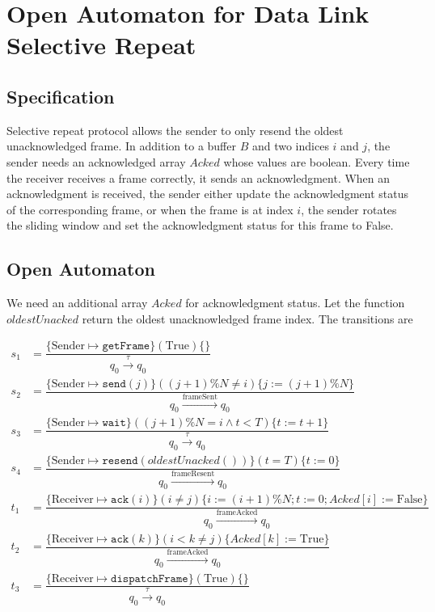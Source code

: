 \section{Open Automaton for Data Link Selective Repeat}
\subsection{Specification}
Selective repeat protocol allows the sender to only resend the oldest unacknowledged frame. In addition to a buffer $B$ and two indices $i$ and $j$, the sender needs an acknowledged array $Acked$ whose values are boolean. Every time the receiver receives a frame correctly, it sends an acknowledgment. When an acknowledgment is received, the sender either update the acknowledgment status of the corresponding frame, or when the frame is at index $i$, the sender rotates the sliding window and set the acknowledgment status for this frame to False.

\subsection{Open Automaton}
We need an additional array $Acked$ for acknowledgment status. Let the function $oldestUnacked$ return the oldest unacknowledged frame index. The transitions are

$$
  \begin{aligned}
    s_1 & = \dfrac{\{\text{Sender}\mapsto \texttt{getFrame}\}(\text{True})\{\}}{q_0\xrightarrow{\tau}q_0}                                                          \\
    s_2 & = \dfrac{\{\text{Sender}\mapsto \texttt{send}(j)\}((j+1)\% N \neq i)\{j:= (j + 1)\%N\}}{q_0\xrightarrow{\text{frameSent}}q_0}                            \\
    s_3 & = \dfrac{\{\text{Sender}\mapsto \texttt{wait}\}((j+1)\% N = i \wedge t < T)\{t:= t + 1\}}{q_0\xrightarrow{\tau}q_0}                                      \\
    s_4 & = \dfrac{\{\text{Sender}\mapsto \texttt{resend}(oldestUnacked())\}(t = T)\{t:= 0\}}{q_0\xrightarrow{\text{frameResent}}q_0}                              \\
    t_1 & = \dfrac{\{\text{Receiver}\mapsto \texttt{ack}(i)\}(i \neq j)\{i:= (i + 1)\%N; t:= 0; Acked[i] := \text{False}\}}{q_0\xrightarrow{\text{frameAcked}}q_0} \\
    t_2 & = \dfrac{\{\text{Receiver}\mapsto \texttt{ack}(k)\}(i < k \ne j)\{Acked[k] := \text{True}\}}{q_0\xrightarrow{\text{frameAcked}}q_0}                      \\
    t_3 & = \dfrac{\{\text{Receiver}\mapsto \texttt{dispatchFrame}\}(\text{True})\{\}}{q_0\xrightarrow{\tau}q_0}                                                   \\
  \end{aligned}
$$


